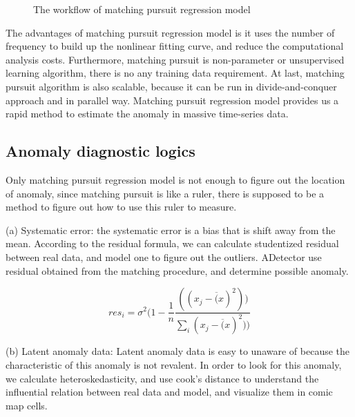 \documentclass{vgtc}                          %
\begin{document}
\begin{figure}[htb]
	\caption{The workflow of matching pursuit regression model}
\end{figure}

The advantages of matching pursuit regression model is it uses the number of frequency to build up the nonlinear fitting curve, and reduce the computational analysis costs. Furthermore, matching pursuit is non-parameter or unsupervised learning algorithm, there is no any training data requirement. At last, matching pursuit algorithm is also scalable, because it can be run in divide-and-conquer approach and in parallel way. Matching pursuit regression model provides us a rapid method to estimate the anomaly in massive time-series data. 

\subsection{Anomaly diagnostic logics}
	Only matching pursuit regression model is not enough to figure out the location of anomaly, since matching pursuit is like a ruler, there is supposed to be a method to figure out how to use this ruler to measure.
	
		(a) Systematic error: the systematic error is a bias that is shift away from the mean. According to the residual formula, we can calculate studentized residual between real data, and model one to figure out the outliers. ADetector use residual obtained from the matching procedure, and determine possible anomaly.
			
	\begin{equation}
	 res_i = \sigma^2 ( 1 -\frac{1}{n} \frac{((x_j - \overline(x)^2))}{\sum_i(x_j - \overline(x)^2))}
	\end{equation}		 
	
		(b) Latent anomaly data: Latent anomaly data is easy to unaware of because the characteristic of this anomaly is not revalent. In order to look for this anomaly, we calculate heteroskedasticity, and use cook's distance to understand the influential relation between real data and model, and visualize them in comic map cells. 
\end{document}
